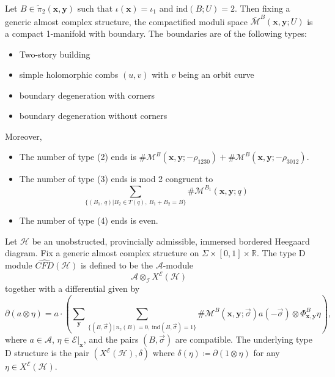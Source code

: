 \documentclass[10pt,a4paper]{amsart}
\begin{document}
\begin{prop}\label{Proposition, ends of moduli space of 1-P curves}
Let $B\in\tilde{\pi}_2(\bm{x},\bm{y})$ such that $\iota(\bm{x})=\iota_1$ and $\text{ind}(B;U)=2$. Then fixing a generic almost complex structure, the compactified moduli space $\overline{\mathcal{M}}^B(\bm{x},\bm{y};U)$ is a compact 1-manifold with boundary. The boundaries are of the following types:
\begin{itemize}
\item[(1)]Two-story building
\item[(2)]simple holomorphic combs $(u,v)$ with $v$ being an orbit curve
\item[(3)]boundary degeneration with corners
\item[(4)]boundary degeneration without corners
\end{itemize}
Moreover, 
\begin{itemize}
\item[(a)]The number of type (2) ends is $\#\mathcal{M}^B(\bm{x},\bm{y};-\rho_{1230})+\#\mathcal{M}^B(\bm{x},\bm{y};-\rho_{3012})$.
\item[(b)]The number of type (3) ends is mod 2 congruent to $$\sum_{\{(B_1,\ q)|B_2\in T(q),\ B_1+B_2=B\}}\#\mathcal{M}^{B_1}(\bm{x},\bm{y};q)$$
\item[(c)]The number of type (4) ends is even.
\end{itemize}
\end{prop}

\begin{defn}\label{Definition, type D structure}
Let $\mathcal{H}$ be an unobstructed, provincially admissible, immersed bordered Heegaard diagram. Fix a generic almost complex structure on $\Sigma\times [0,1] \times \mathbb{R}$. The type D module $\widehat{CFD}(\mathcal{H})$ is defined to be the $\mathcal{A}$-module $$\mathcal{A}\otimes_{\mathcal{I}}X^\mathcal{E}(\mathcal{H})$$ together with a differential given by
$$\partial (a\otimes \eta)=a\cdot(\sum_{\bm{y}}\sum_{\{(B,\overrightarrow{\sigma})|\ n_z(B)=0,\ \text{ind}(B,\overrightarrow{\sigma})=1\}}\#\mathcal{M}^B(\bm{x},\bm{y};\overrightarrow{\sigma})a(-\overrightarrow{\sigma})\otimes \Phi^B_{\bm{x},\bm{y}}\eta),$$
where $a\in\mathcal{A}$, $\eta\in \mathcal{E}|_{\bm{x}}$, and the pairs $(B,\overrightarrow{\sigma})$ are compatible. The underlying type D structure is the pair $(X^\mathcal{E}(\mathcal{H}), \delta)$ where $\delta(\eta)\coloneqq \partial(1\otimes \eta)$ for any $\eta\in X^\mathcal{E}(\mathcal{H})$.
\end{defn}
\end{document}
